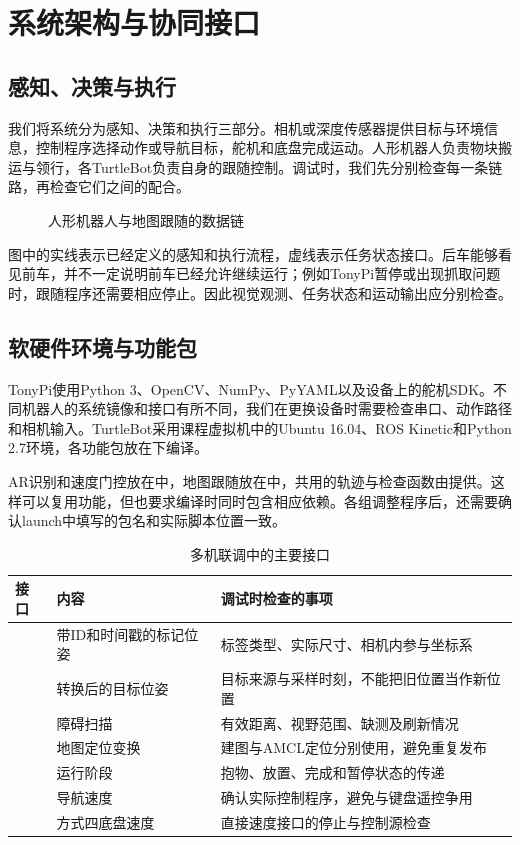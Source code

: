 \section{系统架构与协同接口}

\subsection{感知、决策与执行}
我们将系统分为感知、决策和执行三部分。相机或深度传感器提供目标与环境信息，控制程序选择动作或导航目标，舵机和底盘完成运动。人形机器人负责物块搬运与领行，各TurtleBot负责自身的跟随控制。调试时，我们先分别检查每一条链路，再检查它们之间的配合。
\begin{figure}[H]\centering

\caption{人形机器人与地图跟随的数据链}\label{fig:architecture}
\end{figure}
图中的实线表示已经定义的感知和执行流程，虚线表示任务状态接口。后车能够看见前车，并不一定说明前车已经允许继续运行；例如TonyPi暂停或出现抓取问题时，跟随程序还需要相应停止。因此视觉观测、任务状态和运动输出应分别检查。

\subsection{软硬件环境与功能包}
TonyPi使用Python 3、OpenCV、NumPy、PyYAML以及设备上的舵机SDK。不同机器人的系统镜像和接口有所不同，我们在更换设备时需要检查串口、动作路径和相机输入。TurtleBot采用课程虚拟机中的Ubuntu 16.04、ROS Kinetic和Python 2.7环境，各功能包放在下编译。

AR识别和速度门控放在中，地图跟随放在中，共用的轨迹与检查函数由提供。这样可以复用功能，但也要求编译时同时包含相应依赖。各组调整程序后，还需要确认launch中填写的包名和实际脚本位置一致。

\begin{table}[H]\centering\small
\caption{多机联调中的主要接口}
\begin{tabularx}{\linewidth}{p{37mm}p{40mm}Y}\toprule
接口 & 内容 & 调试时检查的事项\\\midrule
{} & 带ID和时间戳的标记位姿 & 标签类型、实际尺寸、相机内参与坐标系\\
 & 转换后的目标位姿 & 目标来源与采样时刻，不能把旧位置当作新位置\\
 & 障碍扫描 & 有效距离、视野范围、缺测及刷新情况\\
 & 地图定位变换 & 建图与AMCL定位分别使用，避免重复发布\\
 & 运行阶段 & 抱物、放置、完成和暂停状态的传递\\
 & 导航速度 & 确认实际控制程序，避免与键盘遥控争用\\
 & 方式四底盘速度 & 直接速度接口的停止与控制源检查\\\bottomrule
\end{tabularx}\end{table}

